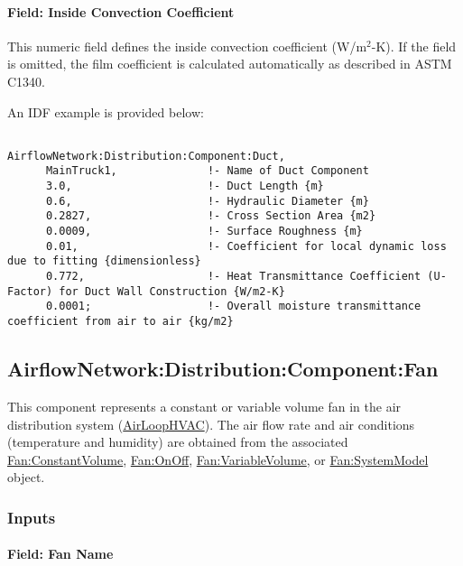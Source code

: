 \paragraph{Field: Inside Convection Coefficient}\label{field-inside-convection-coefficent}

This numeric field defines the inside convection coefficient (W/m\(^{2}\)-K). If the field is omitted, the film coefficient is calculated automatically as described in ASTM C1340.

An IDF example is provided below:

\begin{lstlisting}

AirflowNetwork:Distribution:Component:Duct,
      MainTruck1,              !- Name of Duct Component
      3.0,                     !- Duct Length {m}
      0.6,                     !- Hydraulic Diameter {m}
      0.2827,                  !- Cross Section Area {m2}
      0.0009,                  !- Surface Roughness {m}
      0.01,                    !- Coefficient for local dynamic loss due to fitting {dimensionless}
      0.772,                   !- Heat Transmittance Coefficient (U-Factor) for Duct Wall Construction {W/m2-K}
      0.0001;                  !- Overall moisture transmittance coefficient from air to air {kg/m2}
\end{lstlisting}

\subsection{AirflowNetwork:Distribution:Component:Fan}\label{airflownetworkdistributioncomponentfan}

This component represents a constant or variable volume fan in the air distribution system (\hyperref[airloophvac]{AirLoopHVAC}). The air flow rate and air conditions (temperature and humidity) are obtained from the associated \hyperref[fanconstantvolume]{Fan:ConstantVolume}, \hyperref[fanonoff]{Fan:OnOff}, \hyperref[fanvariablevolume]{Fan:VariableVolume}, or \hyperref[fansystemmodel]{Fan:SystemModel} object.

\subsubsection{Inputs}\label{inputs-16-001}

\paragraph{Field: Fan Name}\label{field-fan-name-000}

